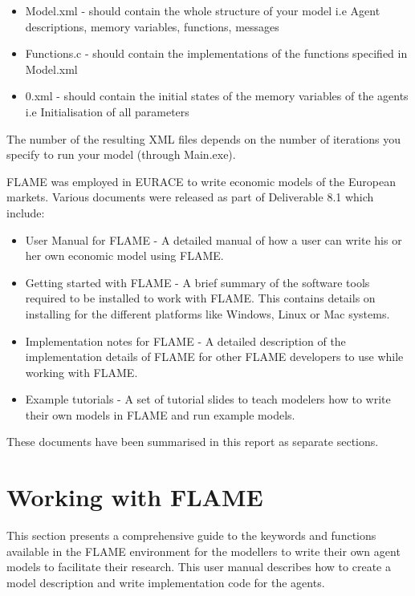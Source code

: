 \documentclass[a4paper,11pt]{article}
\begin{document}
\begin{itemize}
\item  Model.xml - should contain the whole structure of your model
i.e Agent descriptions, memory variables, functions, messages

\item Functions.c - should contain the implementations of the
functions specified in Model.xml

\item 0.xml - should contain the initial states of the memory
variables of the agents i.e Initialisation of all parameters
\end{itemize}

The number of the resulting XML files depends on the number of
iterations you specify to run your model (through Main.exe).

FLAME was employed in EURACE to write economic models of the European markets.  Various documents were released as part of Deliverable 8.1 which include:
\begin{itemize}
\item User Manual for FLAME - A detailed manual of how a user can write his or her own economic model using FLAME.
\item Getting started with FLAME - A brief summary of the software tools required to be installed to work with FLAME. This contains details on installing for the different platforms like Windows, Linux or Mac systems.
\item Implementation notes for FLAME - A detailed description of the implementation details of FLAME for other FLAME developers to use while working with FLAME.
\item Example tutorials - A set of tutorial slides to teach modelers how to write their own models in FLAME and run example models.
\end{itemize}

These documents have been summarised in this report as separate
sections.


\section{Working with FLAME}\label{sect:user}
This section presents a comprehensive guide to the keywords and
functions available in the FLAME environment for the modellers to
write their own agent models to facilitate their research. This user
manual describes how to create a model description and write
implementation code for the agents.
\end{document}
